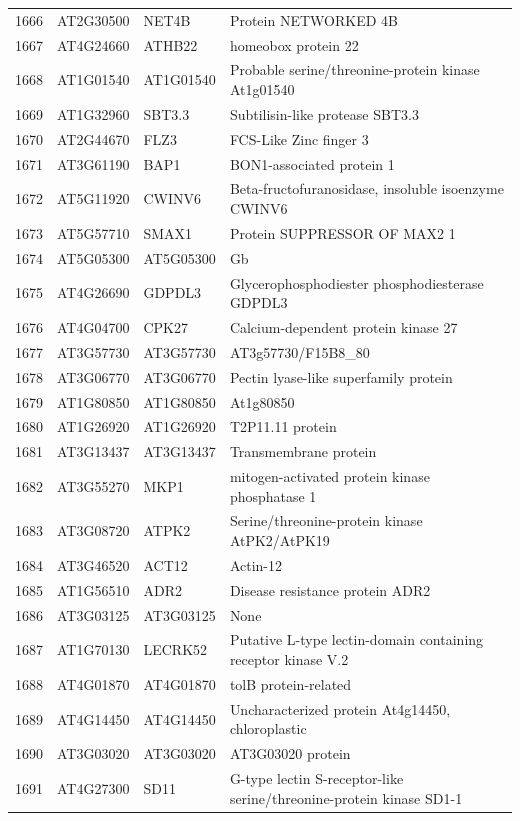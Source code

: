 \documentclass[11pt]{article}
\begin{document}
\begin{center}
\begin{tabular}{rlll}
1666 & AT2G30500 & NET4B & Protein NETWORKED 4B\\
1667 & AT4G24660 & ATHB22 & homeobox protein 22\\
1668 & AT1G01540 & AT1G01540 & Probable serine/threonine-protein kinase At1g01540\\
1669 & AT1G32960 & SBT3.3 & Subtilisin-like protease SBT3.3\\
1670 & AT2G44670 & FLZ3 & FCS-Like Zinc finger 3\\
1671 & AT3G61190 & BAP1 & BON1-associated protein 1\\
1672 & AT5G11920 & CWINV6 & Beta-fructofuranosidase, insoluble isoenzyme CWINV6\\
1673 & AT5G57710 & SMAX1 & Protein SUPPRESSOR OF MAX2 1\\
1674 & AT5G05300 & AT5G05300 & Gb\\
1675 & AT4G26690 & GDPDL3 & Glycerophosphodiester phosphodiesterase GDPDL3\\
1676 & AT4G04700 & CPK27 & Calcium-dependent protein kinase 27\\
1677 & AT3G57730 & AT3G57730 & AT3g57730/F15B8\_80\\
1678 & AT3G06770 & AT3G06770 & Pectin lyase-like superfamily protein\\
1679 & AT1G80850 & AT1G80850 & At1g80850\\
1680 & AT1G26920 & AT1G26920 & T2P11.11 protein\\
1681 & AT3G13437 & AT3G13437 & Transmembrane protein\\
1682 & AT3G55270 & MKP1 & mitogen-activated protein kinase phosphatase 1\\
1683 & AT3G08720 & ATPK2 & Serine/threonine-protein kinase AtPK2/AtPK19\\
1684 & AT3G46520 & ACT12 & Actin-12\\
1685 & AT1G56510 & ADR2 & Disease resistance protein ADR2\\
1686 & AT3G03125 & AT3G03125 & None\\
1687 & AT1G70130 & LECRK52 & Putative L-type lectin-domain containing receptor kinase V.2\\
1688 & AT4G01870 & AT4G01870 & tolB protein-related\\
1689 & AT4G14450 & AT4G14450 & Uncharacterized protein At4g14450, chloroplastic\\
1690 & AT3G03020 & AT3G03020 & AT3G03020 protein\\
1691 & AT4G27300 & SD11 & G-type lectin S-receptor-like serine/threonine-protein kinase SD1-1\\

\end{tabular}
\end{center}
\end{document}
